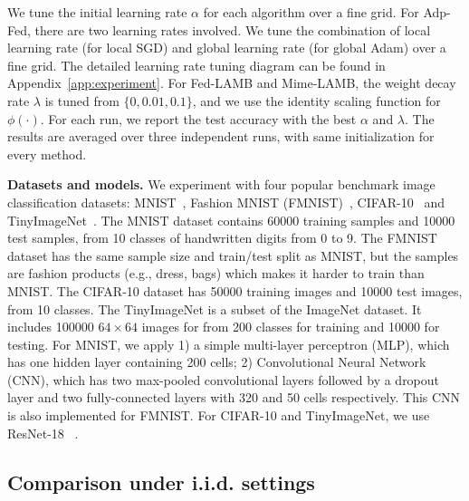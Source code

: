 \documentclass[nohyperref]{article}
\theoremstyle{plain}
\theoremstyle{definition}
\theoremstyle{remark}
\begin{document}
We tune the initial learning rate $\alpha$ for each algorithm over a fine grid. For Adp-Fed, there are two learning rates involved. We tune the combination of local learning rate (for local SGD) and global learning rate (for global Adam) over a fine grid. The detailed learning rate tuning diagram can be found in Appendix~\ref{app:experiment}. For Fed-LAMB and Mime-LAMB, the weight decay rate $\lambda$ is tuned from $\{0,0.01,0.1\}$, and we use the identity scaling function for $\phi(\cdot)$.
For each run, we report the test accuracy with the best $\alpha$ and $\lambda$. 
The results are averaged over three independent runs, with same initialization for every method.



\noindent\textbf{Datasets and models.} We experiment with four popular benchmark image classification datasets: MNIST~\citep{lecun1998mnist}, Fashion MNIST (FMNIST)~\citep{xiao2017fashion}, CIFAR-10~\citep{krizhevsky2009learning} and TinyImageNet~\citep{deng2009imagenet}. The MNIST dataset contains 60000 training samples and 10000 test samples, from 10 classes of handwritten digits from 0 to 9. The FMNIST dataset has the same sample size and train/test split as MNIST, but the samples are fashion products (e.g., dress, bags) which makes it harder to train than MNIST. The CIFAR-10 dataset has 50000 training images and 10000 test images, from 10 classes. The TinyImageNet is a subset of the ImageNet dataset. It includes 100000 $64\times 64$ images for from 200 classes for training and 10000 for testing. For MNIST, we apply 1) a simple multi-layer perceptron (MLP), which has one hidden layer containing 200 cells; 2) Convolutional Neural Network (CNN), which has two max-pooled convolutional layers followed by a dropout layer and two fully-connected layers with 320 and 50 cells respectively. This CNN is also implemented for FMNIST. 
For CIFAR-10 and TinyImageNet, we use ResNet-18 ~\cite{Proc:He-resnet16}.



\subsection{Comparison under i.i.d. settings}
\end{document}

